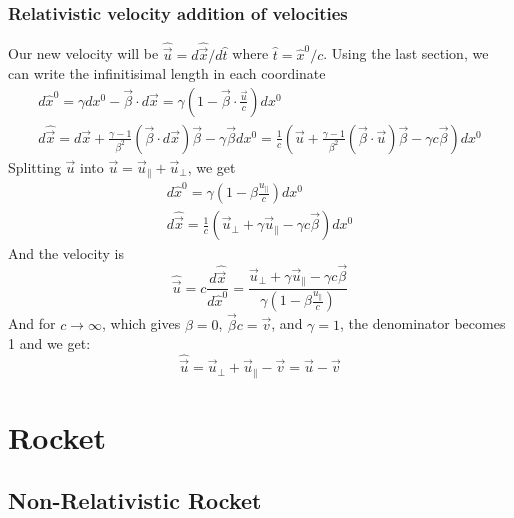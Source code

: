 \documentclass{article}
\begin{document}
\subsubsection{Relativistic velocity addition of velocities}
Our new velocity will be $\hat{\vec{u}} = d\hat{\vec{x}}/d\hat{t}$ where $\hat{t} = \hat{x}^0/c$. Using the last section, we can write the infinitisimal length in each coordinate
\begin{equation}
\begin{gathered}
    d\hat{x}^0 = \gamma dx^0 - \vec{\beta}\cdot d\vec{x} = \gamma\left(1 - \vec{\beta}\cdot \frac{\vec{u}}{c}\right)dx^0
    \\
    d\hat{\vec{x}} = d\vec{x} + \frac{\gamma - 1}{\beta^2}\left(\vec{\beta}\cdot d\vec{x}\right)\vec{\beta} - \gamma\vec{\beta}dx^0 = \frac{1}{c}\left(\vec{u} + \frac{\gamma - 1}{\beta^2}\left(\vec{\beta}\cdot \vec{u}\right)\vec{\beta} - \gamma c\vec{\beta}\right)dx^0
\end{gathered}
\end{equation}
Splitting $\vec{u}$ into $\vec{u} = \vec{u}_{\|} + \vec{u}_\perp$, we get
\begin{equation}
\begin{gathered}
    d\hat{x}^0 = \gamma\left(1 - \beta \frac{u_{\|}}{c}\right)dx^0
    \\
    d\hat{\vec{x}} = \frac{1}{c}\left(\vec{u}_{\perp} + \gamma\vec{u}_{\|} - \gamma c\vec{\beta}\right)dx^0
\end{gathered}
\end{equation}
And the velocity is
\begin{equation}
    \hat{\vec{u}} = c\frac{d\hat{\vec{x}}}{d\hat{x}^0} = \frac{\vec{u}_{\perp} + \gamma\vec{u}_{\|} - \gamma c\vec{\beta}}{\gamma\left(1 - \beta \frac{u_{\|}}{c}\right)}
\end{equation}
And for $c\rightarrow\infty$, which gives $\beta = 0$, $\vec{\beta} c = \vec{v}$, and $\gamma = 1$, the denominator becomes 1 and we get:
\begin{equation}
    \hat{\vec{u}} = \vec{u}_{\perp} + \vec{u}_{\|} - \vec{v} = \vec{u} - \vec{v}
\end{equation}
\section{Rocket}
\subsection{Non-Relativistic Rocket}
\end{document}
